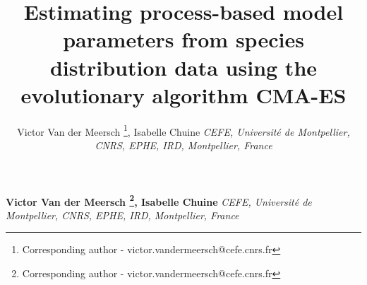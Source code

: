 \documentclass[11pt,]{article}
\title{Estimating process-based model parameters from species
distribution data using the evolutionary algorithm CMA-ES  }
\author{\Large Victor Van der Meersch
\footnote{Corresponding author - victor.vandermeersch@cefe.cnrs.fr},
Isabelle Chuine\vspace{0.05in} \newline\newline\normalsize\emph{CEFE,
Université de Montpellier, CNRS, EPHE, IRD, Montpellier, France}  }
\date{}
\newcommand*{\authorfont}{\fontfamily{phv}\selectfont}
\begin{document}
%

{%
\setlength{\parindent}{0pt}
\thispagestyle{plain}
{\fontsize{18}{20}\selectfont\raggedright
\maketitle  %

}

{
   \vskip 13.5pt\relax \normalsize\fontsize{11}{12}
\textbf{\authorfont Victor Van der Meersch
\footnote{Corresponding author - victor.vandermeersch@cefe.cnrs.fr},
Isabelle Chuine} \hskip 15pt \emph{\small CEFE, Université de
Montpellier, CNRS, EPHE, IRD, Montpellier, France}   

}

}
\end{document}
